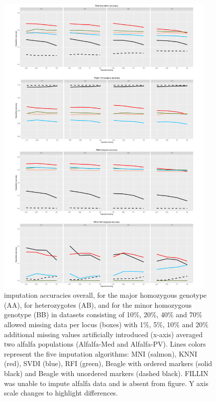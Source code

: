 \begin{figure}
\includegraphics[width=0.95\textwidth]{figure_alfalfa.pdf}
\caption[Alfalfa imputation accuracies]{
imputation accuracies overall, for the major homozygous genotype (AA), for heterozygotes (AB), and for the minor homozygous genotype (BB) in datasets consisting of 10\%, 20\%, 40\% and 70\% allowed missing data per locus (boxes) with 1\%, 5\%, 10\% and 20\% additional missing values artificially introduced (x-axis) averaged two alfalfa populations (Alfalfa-Med and Alfalfa-PV). Lines colors represent the five imputation algorithms: MNI (salmon), KNNI (red), SVDI (blue), RFI (green), Beagle with ordered markers (solid black) and Beagle with unordered markers (dashed black). FILLIN was unable to impute alfalfa data and is absent from figure. Y axis scale changes to highlight differences.}
\label{fig:accuracy_alfalfa}
\end{figure}

